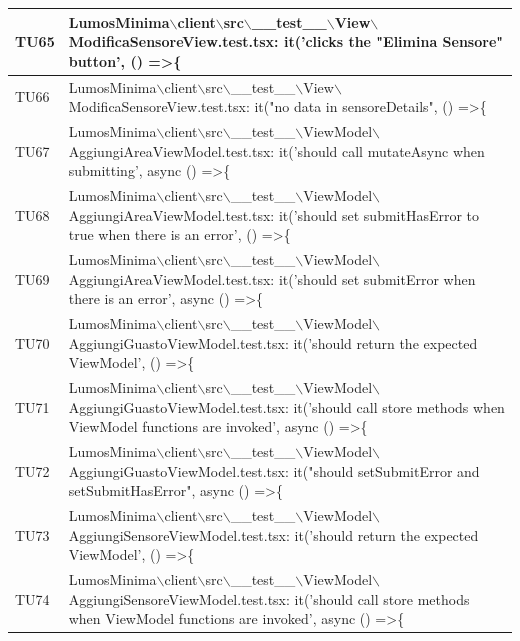 \documentclass[12pt]{article}
\begin{document}
\begin{xltabular}{\linewidth}{|>{\hsize}X|X|}
	TU65 & LumosMinima$\backslash$client$\backslash$src$\backslash$\_\_test\_\_$\backslash$View$\backslash$ModificaSensoreView.test.tsx: it('clicks the "Elimina Sensore" button', () =\textgreater \{ \\ \hline
	TU66 & LumosMinima$\backslash$client$\backslash$src$\backslash$\_\_test\_\_$\backslash$View$\backslash$ModificaSensoreView.test.tsx: it("no data in sensoreDetails", () =\textgreater \{ \\ \hline
	TU67 & LumosMinima$\backslash$client$\backslash$src$\backslash$\_\_test\_\_$\backslash$ViewModel$\backslash$AggiungiAreaViewModel.test.tsx: it('should call mutateAsync when submitting', async () =\textgreater \{ \\ \hline
	TU68 & LumosMinima$\backslash$client$\backslash$src$\backslash$\_\_test\_\_$\backslash$ViewModel$\backslash$AggiungiAreaViewModel.test.tsx: it('should set submitHasError to true when there is an error', () =\textgreater \{ \\ \hline
	TU69 & LumosMinima$\backslash$client$\backslash$src$\backslash$\_\_test\_\_$\backslash$ViewModel$\backslash$AggiungiAreaViewModel.test.tsx: it('should set submitError when there is an error', async () =\textgreater \{ \\ \hline
	TU70 & LumosMinima$\backslash$client$\backslash$src$\backslash$\_\_test\_\_$\backslash$ViewModel$\backslash$AggiungiGuastoViewModel.test.tsx: it('should return the expected ViewModel', () =\textgreater \{ \\ \hline
	TU71 & LumosMinima$\backslash$client$\backslash$src$\backslash$\_\_test\_\_$\backslash$ViewModel$\backslash$AggiungiGuastoViewModel.test.tsx: it('should call store methods when ViewModel functions are invoked', async () =\textgreater \{ \\ \hline
	TU72 & LumosMinima$\backslash$client$\backslash$src$\backslash$\_\_test\_\_$\backslash$ViewModel$\backslash$AggiungiGuastoViewModel.test.tsx: it("should setSubmitError and setSubmitHasError", async () =\textgreater \{ \\ \hline
	TU73 & LumosMinima$\backslash$client$\backslash$src$\backslash$\_\_test\_\_$\backslash$ViewModel$\backslash$AggiungiSensoreViewModel.test.tsx: it('should return the expected ViewModel', () =\textgreater \{ \\ \hline
	TU74 & LumosMinima$\backslash$client$\backslash$src$\backslash$\_\_test\_\_$\backslash$ViewModel$\backslash$AggiungiSensoreViewModel.test.tsx: it('should call store methods when ViewModel functions are invoked', async () =\textgreater \{ \\ \hline

\end{xltabular}
\end{document}
